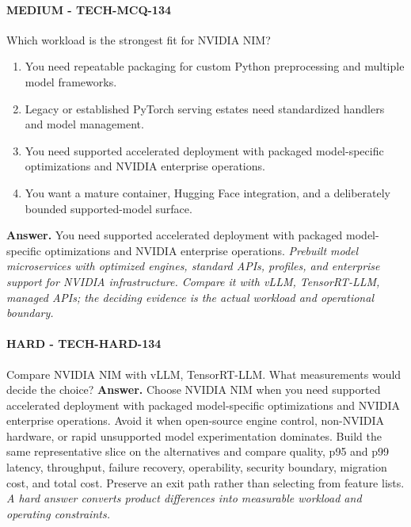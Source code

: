 \paragraph{MEDIUM - TECH-MCQ-134} Which workload is the strongest fit for NVIDIA NIM?
\begin{enumerate}[label=\Alph*.]
\item You need repeatable packaging for custom Python preprocessing and multiple model frameworks.
\item Legacy or established PyTorch serving estates need standardized handlers and model management.
\item You need supported accelerated deployment with packaged model-specific optimizations and NVIDIA enterprise operations.
\item You want a mature container, Hugging Face integration, and a deliberately bounded supported-model surface.
\end{enumerate}
\textbf{Answer.} You need supported accelerated deployment with packaged model-specific optimizations and NVIDIA enterprise operations.
\textit{Prebuilt model microservices with optimized engines, standard APIs, profiles, and enterprise support for NVIDIA infrastructure. Compare it with vLLM, TensorRT-LLM, managed APIs; the deciding evidence is the actual workload and operational boundary.}
\paragraph{HARD - TECH-HARD-134} Compare NVIDIA NIM with vLLM, TensorRT-LLM. What measurements would decide the choice?
\textbf{Answer.} Choose NVIDIA NIM when you need supported accelerated deployment with packaged model-specific optimizations and NVIDIA enterprise operations. Avoid it when open-source engine control, non-NVIDIA hardware, or rapid unsupported model experimentation dominates. Build the same representative slice on the alternatives and compare quality, p95 and p99 latency, throughput, failure recovery, operability, security boundary, migration cost, and total cost. Preserve an exit path rather than selecting from feature lists.
\textit{A hard answer converts product differences into measurable workload and operating constraints.}
